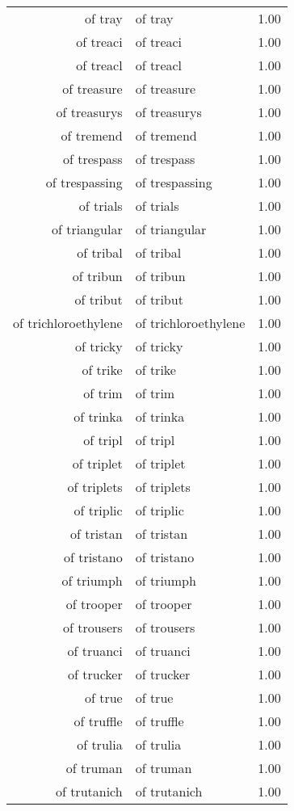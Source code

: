 \begin{table}[ht]
\begin{tabular}{rlr}
  of tray & of tray & 1.00 \\ 
  of treaci & of treaci & 1.00 \\ 
  of treacl & of treacl & 1.00 \\ 
  of treasure & of treasure & 1.00 \\ 
  of treasurys & of treasurys & 1.00 \\ 
  of tremend & of tremend & 1.00 \\ 
  of trespass & of trespass & 1.00 \\ 
  of trespassing & of trespassing & 1.00 \\ 
  of trials & of trials & 1.00 \\ 
  of triangular & of triangular & 1.00 \\ 
  of tribal & of tribal & 1.00 \\ 
  of tribun & of tribun & 1.00 \\ 
  of tribut & of tribut & 1.00 \\ 
  of trichloroethylene & of trichloroethylene & 1.00 \\ 
  of tricky & of tricky & 1.00 \\ 
  of trike & of trike & 1.00 \\ 
  of trim & of trim & 1.00 \\ 
  of trinka & of trinka & 1.00 \\ 
  of tripl & of tripl & 1.00 \\ 
  of triplet & of triplet & 1.00 \\ 
  of triplets & of triplets & 1.00 \\ 
  of triplic & of triplic & 1.00 \\ 
  of tristan & of tristan & 1.00 \\ 
  of tristano & of tristano & 1.00 \\ 
  of triumph & of triumph & 1.00 \\ 
  of trooper & of trooper & 1.00 \\ 
  of trousers & of trousers & 1.00 \\ 
  of truanci & of truanci & 1.00 \\ 
  of trucker & of trucker & 1.00 \\ 
  of true & of true & 1.00 \\ 
  of truffle & of truffle & 1.00 \\ 
  of trulia & of trulia & 1.00 \\ 
  of truman & of truman & 1.00 \\ 
  of trutanich & of trutanich & 1.00 \\ 

\end{tabular}
\end{table}
